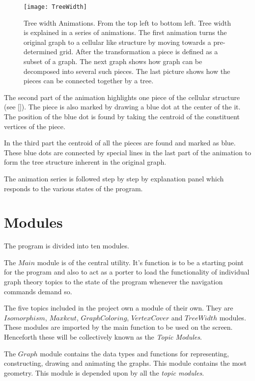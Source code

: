 \begin{figure}[ht]
\centering
\texttt{[image: TreeWidth]}
\caption{
        Tree width Animations. From the top left to bottom left. Tree width is
        explained in a series of animations. The first animation turns the
        original graph to a cellular like structure by moving towards a
        pre-determined grid.  After the transformation a piece is defined as a
        subset of a graph.  The next graph shows how graph can be decomposed
        into several such pieces.  The last picture shows how the pieces can be
        connected together by a tree.
        }
\label{animationfigure: vertexCover}
\end{figure}

The second part of the animation highlights one piece of the cellular structure
(see \autoref{}). The piece is also marked by drawing a blue dot at the center
of the it. The position of the blue dot is found by  taking the centroid of the
constituent vertices of the piece.

In the third part the centroid of all the pieces are found and marked as blue.
These blue dots are connected by special lines in the last part of the
animation to form the tree structure inherent in the original graph.

The animation series is followed step by step by explanation panel which responds
to the various states of the program.


\section{Modules}

The program is divided into ten modules.

The $Main$ module is of the central utility. It's function is to be a
starting point for the program and also to act as a porter to load the
functionality of individual graph theory topics to the state of the program
whenever the navigation commands demand so. 

The five topics included in the project own a module of their own. They are
$Isomorphism$, $Maxkcut$, $GraphColoring$, $VertexCover$ and $TreeWidth$ modules.
These modules are imported by the main function to be used on the screen.
Henceforth these will be collectively known as the \emph{Topic Modules}.

The $Graph$ module contains the data types and functions for representing,
constructing, drawing and animating the graphs. This module contains the most
geometry. This module is depended upon by all the \emph{topic modules}.

